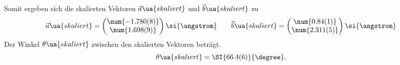 Somit ergeben sich die skalierten Vektoren $\vec{a}\ua{skaliert}$ und $\vec{b}\ua{skaliert}$ zu
\begin{equation}
  \vec{a}\ua{skaliert} = \begin{pmatrix} \num{-1.780(8)} \\  \num{1.698(9)} \end{pmatrix}\si{\angstrom} \qquad
  \vec{b}\ua{skaliert} = \begin{pmatrix} \num{0.84(1)} \\  \num{2.311(5)} \end{pmatrix}\si{\angstrom}
\end{equation}
Der Winkel $\theta\ua{skaliert}$ zwischen den skalierten Vektoren beträgt.
\begin{equation}
  \theta\ua{skaliert} = \SI{66.4(6)}{\degree}.
\end{equation}


